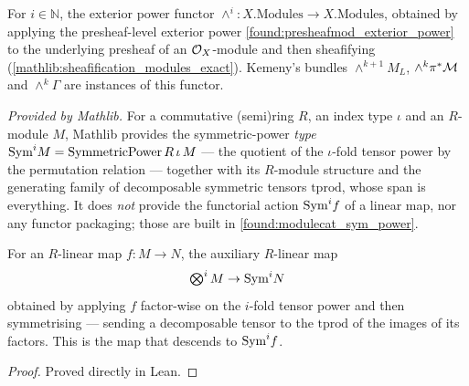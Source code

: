 \begin{definition}\leanok
  \label{found:oxmod_exterior_power}
  For \(i\in\mathbb N\), the exterior power functor
  \(\wedge^i:X.\mathrm{Modules}\to X.\mathrm{Modules}\), obtained by applying the
  presheaf-level exterior power \cref{found:presheafmod_exterior_power} to the
  underlying presheaf of an \(\mathcal{O}_X\)-module and then sheafifying
  (\cref{mathlib:sheafification_modules_exact}).  Kemeny's bundles
  \(\wedge^{k+1}M_L\), \(\wedge^k\pi^*\mathcal{M}\) and \(\wedge^k\Gamma\) are instances
  of this functor.
\end{definition}

\begin{definition}
  \label{mathlib:symmetricpower_type}
  \mathlibok
  \textit{Provided by Mathlib.}
  For a commutative (semi)ring \(R\), an index type \(\iota\) and an
  \(R\)-module \(M\), Mathlib provides the symmetric-power \emph{type}
  \(\mathrm{Sym}^i M=\mathrm{SymmetricPower}\,R\,\iota\,M\) --- the quotient of the
  \(\iota\)-fold tensor power by the permutation relation --- together with its
  \(R\)-module structure and the generating family of decomposable symmetric
  tensors \(\mathrm{tprod}\), whose span is everything.  It does \emph{not}
  provide the functorial action \(\mathrm{Sym}^i f\) of a linear map, nor any functor
  packaging; those are built in \cref{found:modulecat_sym_power}.
\end{definition}

\begin{lemma}
  \label{found:sympow_map_aux}
  For an \(R\)-linear map \(f:M\to N\), the auxiliary \(R\)-linear map
  \[
    \textstyle\bigotimes^i M\to\mathrm{Sym}^i N
  \]
  obtained by applying \(f\) factor-wise on the \(i\)-fold tensor power and then
  symmetrising --- sending a decomposable tensor to the \(\mathrm{tprod}\) of the
  images of its factors.  This is the map that descends to \(\mathrm{Sym}^i f\).
\end{lemma}

\begin{proof}

\leanok
  Proved directly in Lean.
\end{proof}

